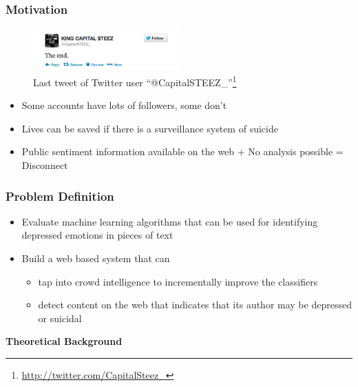 \documentclass{beamer}
\begin{document}
    \begin{frame}
        \frametitle{Motivation}
        \begin{figure}
            \centering
            \includegraphics[width=0.5\textwidth]{figures/twitter_kcs.png}
            \caption{Last tweet of Twitter user ``@CapitalSTEEZ\_''\footnote{\url{http://twitter.com/CapitalSteez\_}}}
        \end{figure}
        \begin{itemize}
            \item{Some accounts have lots of followers, some don't}
            \item{Lives can be saved if there is a surveillance system of suicide}
            \item{Public sentiment information available on the web + No analysis possible = Disconnect}
        \end{itemize}
    \end{frame}
    
    \begin{frame}
        \frametitle{Problem Definition}
        \begin{itemize}
            \item{Evaluate machine learning algorithms that can be used for identifying depressed emotions in pieces of text}
            \item{
            Build a web based system that can
            \begin{itemize}
                \item{tap into crowd intelligence to incrementally improve the classifiers}
                \item{detect content on the web that indicates that its author may be depressed or suicidal}
            \end{itemize}
            }
        \end{itemize}
    \end{frame}
    
    \begin{frame}
        \begin{center}
            \textbf{Theoretical Background}
        \end{center}
    \end{frame}
    
\end{document}
